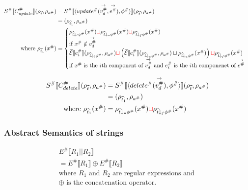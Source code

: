 \begin{align*}
    S^\# \llbracket C^\#_{update} \rrbracket(\rho_{\widehat{t}}, \rho_{a^\#})
                                              & = S^\# \llbracket \langle update^\#(\overset{\rightarrow}{v_d^\#}, \overset{\rightarrow}{e^\#}), \phi^\# \rangle \rrbracket (\rho_{\widehat{t}}, \rho_{a^\#}) \\
                                              & = (\rho_{\widehat{t}_1}, \rho_{a^\#})                                                                 \\
    \text{where } \rho_{\widehat{t}_1}(x^\#) & =
    \begin{cases}
        \rho_{\widehat{t} \downarrow_t \phi^\#}(x^\#) \textcolor{red}{\sqcup} \rho_{\widehat{t} \downarrow_u \phi^\#}(x^\#) \textcolor{red}{\sqcup} \rho_{\widehat{t} \downarrow_f \phi^\#}(x^\#)                             \\
        \text{if } x^\# \notin \overset{\rightarrow}{v_d^\#}                                                                                                                                                                                        \\
        \widehat{\mathcal{E}}\llbracket e^\#_{i} \rrbracket(\rho_{\widehat{t} \downarrow_t \phi^\#}, \rho_{a^\#}) \textcolor{red}{\sqcup}
        \left( \widehat{\mathcal{E}}\llbracket e^\#_{i} \rrbracket(\rho_{\widehat{t} \downarrow_u \phi^\#}, \rho_{a^\#}) \sqcup \rho_{\widehat{t} \downarrow_u \phi^\#}(x^\#) \right) \textcolor{red}{\sqcup} \rho_{\widehat{t} \downarrow_f \phi^\#}(x^\#) \\
        \text{if $x^\#$ is the $i$th component of $\overset{\rightarrow}{v_d^\#}$ and $e^\#_{i}$ is the $i$th componenet of $\overset{\rightarrow}{e^\#}$}                                                                                                           \\
    \end{cases}
\end{align*}

\begin{align*}
    S^\# \llbracket C^\#_{delete} \rrbracket(\rho_{\widehat{t}}, \rho_{a^\#})
    &= S^\# \llbracket \langle delete^\#(\overset{\rightarrow}{v_d^\#}), \phi^\# \rangle \rrbracket (\rho_{\widehat{t}}, \rho_{a^\#}) \\
    &= (\rho_{\widehat{t}_1}, \rho_{a^\#}) \\
    \text{where } \rho_{\widehat{t}_1}(x^\#) &= \rho_{\widehat{t} \downarrow_u \phi^\#}(x^\#) \textcolor{red}{\sqcup} \rho_{\widehat{t} \downarrow_f \phi^\#}(x^\#)
\end{align*}

\subsubsection{Abstract Semantics of strings}
\begin{align*}
    E^\# \llbracket R_1 \texttt{||} R_2 \rrbracket                          \\
    = E^\# \llbracket R_1 \rrbracket \oplus  E^\# \llbracket R_2 \rrbracket \\
    \text{where } R_1 \text{ and } R_2 \text{ are regular expressions and } \\
    \oplus \text{ is the concatenation operator.}
\end{align*}

